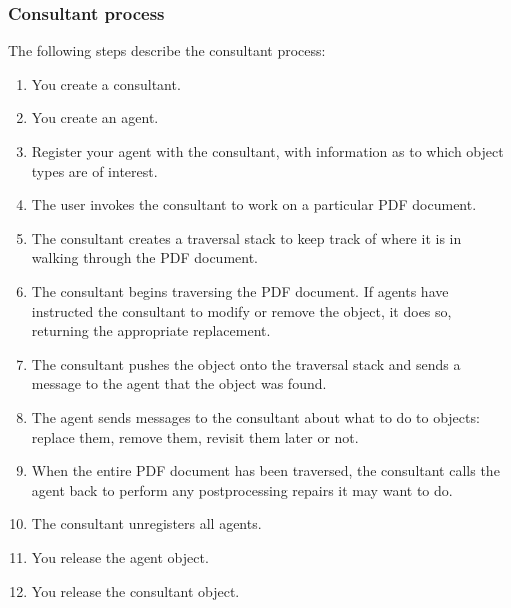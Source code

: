 \documentclass[letterpaper,12pt,english,openany,oneside]{sphinxmanual}
\begin{document}
\subsubsection{Consultant process}
\label{\detokenize{Plugins_ExtendedAPI:consultant-process}}
The following steps describe the consultant process:
\begin{enumerate}
%
\item {} 
You create a consultant.

\item {} 
You create an agent.

\item {} 
Register your agent with the consultant, with information as to which object types are of interest.

\item {} 
The user invokes the consultant to work on a particular PDF document.

\item {} 
The consultant creates a traversal stack to keep track of where it is in walking through the PDF document.

\item {} 
The consultant begins traversing the PDF document. If agents have instructed the consultant to modify or remove the object, it does so, returning the appropriate replacement.

\item {} 
The consultant pushes the object onto the traversal stack and sends a message to the agent that the object was found.

\item {} 
The agent sends messages to the consultant about what to do to objects: replace them, remove them, revisit them later or not.

\item {} 
When the entire PDF document has been traversed, the consultant calls the agent back to perform any post\sphinxhyphen{}processing repairs it may want to do.

\item {} 
The consultant unregisters all agents.

\item {} 
You release the agent object.

\item {} 
You release the consultant object.

\end{enumerate}
\end{document}
